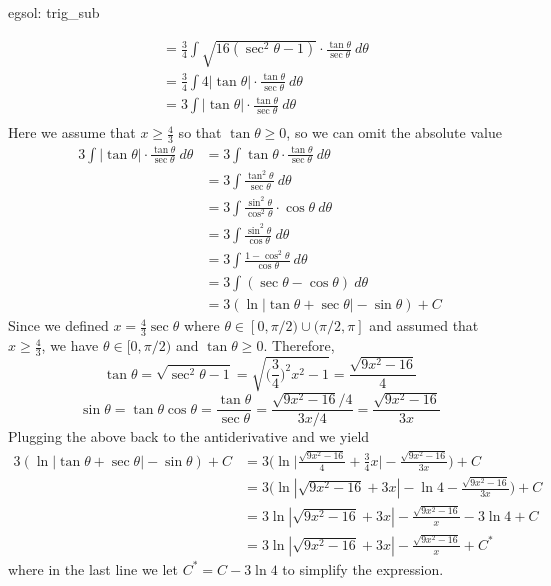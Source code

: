 \begin{egsol}[]{egsol: trig_sub}
\begin{enumerate}[a)]
\begin{align*}
                &=\frac{3}{4}\int \sqrt{16(\sec^2\theta-1)}\cdot\frac{\tan\theta}{\sec\theta}~d\theta\\
                &=\frac{3}{4}\int 4|\tan\theta|\cdot\frac{\tan\theta}{\sec\theta}~d\theta\\
                &=3\int |\tan\theta|\cdot\frac{\tan\theta}{\sec\theta}~d\theta\\
            \end{align*}
            Here we assume that $x \ge \frac{4}{3}$ so that $\tan \theta \ge 0$, so we can omit the absolute value
            \begin{align*}
                3\int |\tan\theta|\cdot\frac{\tan\theta}{\sec\theta}~d\theta &= 3\int \tan\theta\cdot\frac{\tan\theta}{\sec\theta}~d\theta\\
                &= 3\int \frac{\tan^2\theta}{\sec\theta}~d\theta\\
                &= 3\int \frac{\sin^2\theta}{\cos^2\theta}\cdot\cos\theta~d\theta\\
                &= 3\int \frac{\sin^2\theta}{\cos\theta}~d\theta\\
                &= 3\int \frac{1-\cos^2\theta}{\cos\theta}~d\theta\\
                &= 3\int (\sec\theta-\cos\theta)~d\theta\\
                &= 3(\ln|\tan \theta + \sec \theta| - \sin\theta) + C
            \end{align*}
            Since we defined $x = \frac{4}{3}\sec \theta$ where $\theta \in [0, \pi/2) \cup (\pi/2, \pi]$ and assumed that $x \ge \frac{4}{3}$, we have $\theta \in [0, \pi/2)$ and $\tan \theta \ge 0$.  Therefore,
            \[\tan \theta = \sqrt{\sec^2\theta - 1} = \sqrt{\big(\frac{3}{4}\big)^2x^2 - 1} = \frac{\sqrt{9x^2-16}}{4}\]
            \[\sin \theta = \tan\theta \cos\theta = \frac{\tan\theta}{\sec\theta} = \frac{\sqrt{9x^2-16}/4}{3x/4} = \frac{\sqrt{9x^2-16}}{3x}\]
            Plugging the above back to the antiderivative and we yield
            \begin{align*}
                3(\ln|\tan \theta + \sec \theta| - \sin\theta) + C &= 3\Big(\ln\Big|\frac{\sqrt{9x^2-16}}{4} + \frac{3}{4}x\Big| - \frac{\sqrt{9x^2-16}}{3x}\Big) + C\\
                &=3\Big(\ln|\sqrt{9x^2-16} + 3x| - \ln 4 - \frac{\sqrt{9x^2-16}}{3x}\Big) + C\\
                &=3\ln|\sqrt{9x^2-16} + 3x| - \frac{\sqrt{9x^2-16}}{x} - 3\ln 4 + C\\
                &= 3\ln|\sqrt{9x^2-16} + 3x| - \frac{\sqrt{9x^2-16}}{x} +C^*
            \end{align*}
            where in the last line we let $C^* = C - 3\ln 4$ to simplify the expression.
        \end{enumerate}
    \end{egsol}

